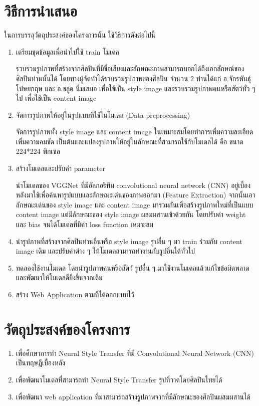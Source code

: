 \documentclass[12pt,oneside,openright,a4paper]{cpe-thai-project}
\begin{document}
\section{วิธีการนำเสนอ}
\par\setlength{\parindent}{5ex}ในการบรรลุวัตถุประสงค์ของโครงการนั้น ใช้วิธีการดังต่อไปนี้
\begin{enumerate}
\item เตรียมชุดข้อมูลเพื่อนำไปใช้ train โมเดล\par\setlength{\parindent}{5ex}รวบรวมรูปภาพที่สร้างจากศิลปินที่มีชื่อเสียงและลักษณะภาพสามารถบอกได้ถึงเอกลักษณ์ของศิลปินท่านนั้นได้ โดยทางผู้จัดทำได้รวบรวมรูปภาพของศิลปิน จำนวน 2 ท่านได้แก่ อ.จักรพันธุ์ โปษยกฤษ และ อ.ชลูด นิ่มเสมอ เพื่อใช้เป็น style image และรวบรวมรูปภาพคนหรือสัตว์ทั่ว ๆ ไป เพื่อใช้เป็น content image
\item จัดการรูปภาพให้อยู่ในรูปแบบที่ใช้ในโมเดล (Data preprocessing)\par\setlength{\parindent}{5ex} จัดการรูปภาพทั้ง style image และ content image ในเหมาะสมโดยทำการเพิ่มความละเอียด เพิ่มความคมชัด เป็นต้นและแปลงรูปภาพให้อยู่ในลักษณะที่สามารถใช้กับโมเดลได้ คือ ขนาด 224*224 พิกเซล
\item สร้างโมเดลและปรับค่า parameter \par\setlength{\parindent}{5ex}นำโมเดลของ VGGNet ที่มีอัลกอริทึม convolutional neural network (CNN) อยู่เบื้องหลังมาใช้เพื่อค้นหารูปแบบและลักษณะเด่นของภาพออกมา (Feature Extraction) จากนั้นเอาลักษณะเด่นของ style image และ content image มารวมกันเพื่อสร้างรูปภาพใหม่ที่เป็นแบบ content image แต่มีลักษณะของ style  image ผสมผสานเข้าด้วยกัน โดยปรับค่า weight และ bias จนได้โมเดลที่มีค่า loss function เหมาะสม
\item นำรูปภาพที่สร้างจากศิลปินท่านอื่นหรือ style image รูปอื่น ๆ มา train ร่วมกับ content image เดิม และปรับค่าต่าง ๆ ให้โมเดลสามารถทำงานกับรูปอื่นได้ทั่วไป
\item ทดลองใช้งานโมเดล โดยนำรูปภาพคนหรือสัตว์ รูปอื่น ๆ มาใช้งานโมเดลแล้วแก้ไขข้อผิดพลาดและพัฒนาให้โมเดลดียิ่งขึ้นจากเดิม
\item สร้าง Web Application ตามที่ได้ออกแบบไว้
\end{enumerate}

\newpage

\section{วัตถุประสงค์ของโครงการ}
\begin{enumerate}
  \item	เพื่อศึกษาการทำ Neural Style Transfer ที่มี Convolutional Neural Network (CNN) เป็นทฤษฎีเบื้องหลัง
  \item เพื่อพัฒนาโมเดลที่สามารถทำ Neural Style Transfer รูปที่วาดโดยศิลปินไทยได้
  \item เพื่อพัฒนา web application ที่มาสามารถสร้างรูปภาพจากที่มีลักษณะของศิลปินผสมผสานได้
\end{enumerate}
\end{document}
